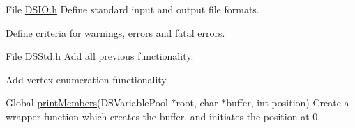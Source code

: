 \label{todo__todo000001}
\hypertarget{todo__todo000001}{}
 
\begin{DoxyDescription}
\item[File \hyperlink{_d_s_i_o_8h}{DSIO.h} ]Define standard input and output file formats. 

Define criteria for warnings, errors and fatal errors.


\end{DoxyDescription}

\label{todo__todo000002}
\hypertarget{todo__todo000002}{}
 
\begin{DoxyDescription}
\item[File \hyperlink{_d_s_std_8h}{DSStd.h} ]Add all previous functionality. 

Add vertex enumeration functionality.


\end{DoxyDescription}

\label{todo__todo000003}
\hypertarget{todo__todo000003}{}
 
\begin{DoxyDescription}
\item[Global \hyperlink{_d_s_variable_8c_aa807b488d1b5c23e628a63e99ef8d0d9}{printMembers}(DSVariablePool $\ast$root, char $\ast$buffer, int position) ]Create a wrapper function which creates the buffer, and initiates the position at 0. 
\end{DoxyDescription}